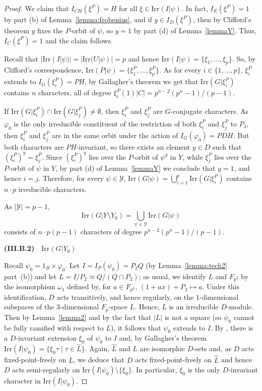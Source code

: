 \documentclass{amsart}
\def\irr#1{\mathrm{Irr}(#1)}
\begin{document}
\begin{proof}
We claim that $I_{CH}(\xi^P) = H$ for all $\xi \in \irr{I|\psi}$.
In fact, $I_E(\xi^P) = 1$ by part (b) of Lemma~\ref{lemma:frobenius},  and if $y \in I_D(\xi^P)$, then by Clifford's theorem  $y$ fixes the $P$-orbit of $\psi$,
so $y = 1$ by part (d) of Lemma~\ref{lemmaY}. Thus,  $I_{C}(\xi^P) = 1$ and the claim follows.

Recall that $|\irr{I|\psi}| = |\irr{U|\psi}| = p$ and hence $\irr{I|\psi} = \{ \xi_1, \ldots, \xi_p\}$. So, by Clifford's correspondence, $\irr {P|\psi}=\{\xi_1^P,\ldots,\xi_p^P\}$. As for every $i\in \{1,\ldots,p\}$, $\xi_i^P$ extends to $I_{G}(\xi_i^P)=PH$, by Gallagher's theorem  we get  that
$\irr{G| \xi_i^P}$ contains $n$ characters, all of degree $\xi_i^P(1)|C| = p^{n-2}(p^n-1)/(p-1)$.

If $\irr{G|\xi_i^P} \cap \irr{G|\xi_j^P} \neq \emptyset$, then $\xi_i^P$ and $\xi_j^P$ are $G$-conjugate characters.
As $\varphi_0$ is the only irreducible constituent of  the restriction of both $\xi_i^P$ and $\xi_j^P$ to $P_3$,
then $\xi_i^P$ and $\xi_j^P$ are in the same orbit under the action
of $I_G(\varphi_0) = PDH$.  But both characters are $PH$-invariant, so there exists an  element $y \in D$ such that $(\xi_i^P)^y = \xi_j^P$.
Since  $(\xi_i^P)^y $ lies over the $P$-orbit of $\psi^y$ in $Y$, while $\xi_j^P$ lies over the $P$-orbit of $\psi$ in $Y$,
by part (d) of Lemma~\ref{lemmaY} we conclude that $y = 1$, and hence $i = j$.
Therefore, for every $\psi \in \mathcal{Y}$, $\irr{G|\psi} = \bigcup_{i=1}^p \irr{G|\xi_i^P}$ contains $n \cdot p$ irreducible characters.

 As $|\mathcal{Y}| = p-1$,
$$\irr{G| Y \setminus Y_0} = \bigcup_{\psi \in \mathcal{Y}} \irr{G|\psi}$$
consists of
$n\cdot p(p-1)$ characters of degree $p^{n-2}(p^n-1)/(p-1)$.

\medskip
{\bf (III.B.2)}~~$\irr{G|Y_0}$

\smallskip
Recall $\psi_0=1_B\times \varphi_0$. Let $I=I_P(\psi_0)= P_2Q$ (by Lemma~\ref{lemma:tech2} part~(b)) and let $L = I/P_2 \simeq Q/(Q \cap P_2)$;
 as usual, we identify $L$ and $F_{p^3}$ by the isomorphism $\omega_1$  defined by, for $a \in F_{p^3}$,
$(1+a x) +P_2  \mapsto a$.
Under this identification, $D$ acts transitively, and hence regularly,  on the $1$-dimensional subspaces of the
$3$-dimensional $F_p$-space $L$.  Hence, $L$ is an irreducible $D$-module.
 Then by  Lemma~\ref{lemma2} and by the fact that $|L|$ is not a square
 (so $\psi_0$ cannot be  fully ramified with respect to $L$), it follows that $\psi_0$ extends to $I$.
 By \cite[Theorem 13.28]{isaacs}, there is a $D$-invariant extension $\xi_0$ of $\psi_0$ to $I$ and, by Gallagher's theorem
 $\irr{I| \psi_0} = \{ \xi_0 \tau \mid \tau \in \widehat{L} \}$.
 Again,  $\widehat{L}$ and $L$ are  isomorphic $D$-sets
 and, as $D$ acts fixed-point-freely on $L$, we deduce that $D$ acts fixed-point-freely on $\widehat{L}$ and hence $D$ acts
 semi-regularly on $\irr{I| \psi_0} \setminus \{ \xi_0 \}$.
 In particular, $\xi_0$ is the only $D$-invariant character in $\irr{I| \psi_0}$.


\end{proof}
\end{document}
